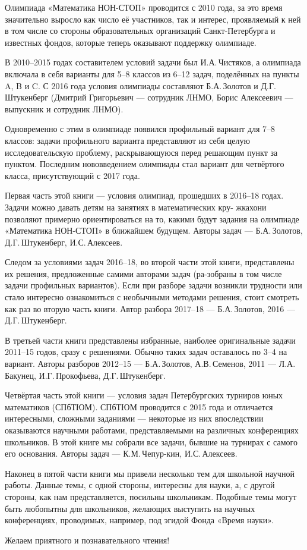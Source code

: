 \noindent\abz Олимпиада «Математика НОН-СТОП» проводится с 2010 года, за это время значительно выросло как число её участников, так и интерес, проявляемый к ней в том числе со стороны образовательных организаций Санкт-Петербурга и известных фондов, которые теперь оказывают поддержку олимпиаде.

\aabz В 2010–2015 годах составителем условий задачи был И.А.\,Чистяков, а олимпиада включала в себя варианты для 5–8 классов из 6–12 задач, поделённых на пункты A, B и C. С 2016 года условия олимпиады составляют Б.А.\,Золотов и Д.Г.\,Штукенберг (Дмитрий Григорьевич — сотрудник ЛНМО, Борис Алексеевич — выпускник и сотрудник ЛНМО).

\aabz Одновременно с этим в олимпиаде появился профильный вариант для 7–8 классов: задачи профильного варианта представляют из себя целую исследовательскую проблему, раскрывающуюся перед решающим пункт за пунктом. Последним нововведением олимпиады стал вариант для четвёртого класса, присутствующий с 2017 года.

\aabz Первая часть этой книги — условия олимпиад, прошедших в 2016–18 годах. Задачи можно давать детям на занятиях в математических кру- жках\scolon они позволяют примерно ориентироваться на то, какими будут задания на олимпиаде «Математика НОН-СТОП» в ближайшем будущем. Авторы задач — Б.А.\,Золотов, Д.Г.\,Штукенберг, И.С.\,Алексеев.

\aabz Следом за условиями задач 2016–18, во второй части этой книги, представлены их решения, предложенные самими авторами задач (ра-\linebreak зобраны в том числе задачи профильных вариантов). Если при разборе задачи возникли трудности или стало интересно ознакомиться с необычными методами решения, стоит смотреть как раз во вторую часть книги. Автор разбора 2017–18 — Б.А.\,Золотов, 2016 — Д.Г.\,Штукенберг.

\aabz В третьей части книги представлены избранные, наиболее оригинальные задачи 2011–15 годов, сразу с решениями. Обычно таких задач оставалось по 3–4 на вариант. Авторы разборов 2012–15 — Б.А.\,Золотов, А.В.\,Семенов, 2011 — Л.А.\,Бакунец, И.Г.\,Прокофьева, Д.Г.\,Штукенберг.

\aabz Четвёртая часть этой книги — условия задач Петербургских турниров юных математиков (СПбТЮМ). СПбТЮМ проводится с 2015 года и отличается интересными, сложными заданиями — некоторые из них впоследствии оказываются научными работами, представляемыми на различных конференциях школьников. В этой книге мы собрали все задачи, бывшие на турнирах с самого его основания. Авторы задач — К.М.\,Чепур-\linebreak кин, И.С.\,Алексеев.

\aabz Наконец в пятой части книги мы привели несколько тем для школьной научной работы. Данные темы, с одной стороны, интересны для науки, а, с другой стороны, как нам представляется, посильны школьникам. Подобные темы могут быть любопытны для школьников, желающих выступить на научных конференциях, проводимых, например, под эгидой Фонда «Время науки».

\aabz Желаем приятного и познавательного чтения!